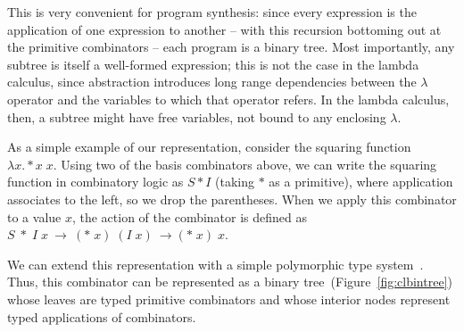 \documentclass{article}
\begin{document}
This is very convenient for program synthesis: since every expression
is the application of one expression to another -- with this recursion
bottoming out at the primitive combinators -- each program is a binary
tree. Most importantly, any subtree is itself a well-formed
expression; this is not the case in the lambda calculus, since
abstraction introduces long range dependencies between the $\lambda$
operator and the variables to which that operator refers. In the
lambda calculus, then, a subtree might have free variables, not bound
to any enclosing $\lambda$. 

As a simple example of our representation, consider the squaring
function $\lambda x. * x\; x $. Using two of the basis combinators
above, we can write the squaring function in combinatory logic as $S *
I$ (taking $*$ as a primitive), where application associates to the
left, so we drop the parentheses. When we apply this combinator to a
value $x$, the action of the combinator is defined as $S \;*\; I\;
x~\rightarrow~(*\; x)\; (I\; x)~\rightarrow(*\; x)\; x$.

We can extend this representation with a simple polymorphic type
system~\cite{Pierce_2002}. Thus, this combinator can be represented as
a binary tree~(Figure~\ref{fig:clbintree}) whose leaves are typed
primitive combinators and whose interior nodes represent typed applications
of combinators.
\end{document}

